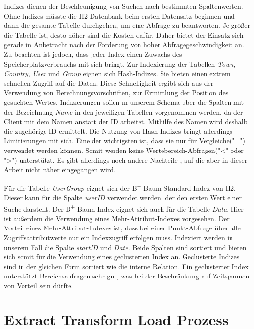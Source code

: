Indizes dienen der Beschleunigung von Suchen nach bestimmten Spaltenwerten. Ohne Indizes müsste die H2-Datenbank beim ersten Datensatz beginnen und dann die gesamte Tabelle durchgehen, um eine Abfrage zu beantworten. Je größer die Tabelle ist, desto höher sind die Kosten dafür. Daher bietet der Einsatz sich gerade in Anbetracht nach der Forderung von hoher Abfragegeschwindigkeit an. Zu beachten ist jedoch, dass jeder Index einen Zuwachs des Speicherplatzverbrauchs mit sich bringt. Zur Indexierung der Tabellen \textit{Town}, \textit{Country}, \textit{User} und \textit{Group} eignen sich Hash-Indizes. Sie bieten einen extrem schnellen Zugriff auf die Daten. Diese Schnelligkeit ergibt sich aus der Verwendung von Berechnungsvorschriften, zur Ermittlung der Position des gesuchten Wertes. Indizierungen sollen in unserem Schema über die Spalten mit der Bezeichnung \textit{Name} in den jeweiligen Tabellen vorgenommen werden, da der Client mit dem Namen anstatt der ID arbeitet. Mithilfe des Namen wird deshalb die zugehörige ID ermittelt. Die Nutzung von Hash-Indizes bringt allerdings Limitierungen mit sich. Eine der wichtigsten ist, dass sie nur für Vergleiche("=") verwendet werden können. Somit werden keine Wertebereich-Abfragen("<" oder ">") unterstützt. Es gibt allerdings noch andere Nachteile \cite{SWB-352401869}, auf die aber in dieser Arbeit nicht näher eingegangen wird. 

Für die Tabelle \textit{UserGroup} eignet sich der B\textsuperscript{+}-Baum Standard-Index von H2. Dieser kann für die Spalte \textit{userID} verwendet werden, der den ersten Wert einer Suche darstellt. Der B\textsuperscript{+}-Baum-Index eignet sich auch für die Tabelle \textit{Data}. Hier ist außerdem die Verwendung eines Mehr-Attribut-Indexes vorgesehen. Der Vorteil eines Mehr-Attribut-Indexes ist, dass bei einer Punkt-Abfrage über alle Zugriffsattributwerte nur ein Indexzugriff erfolgen muss. Indexiert werden in unserem Fall die Spalte \textit{startID} und \textit{Date}. Beide Spalten sind sortiert und bieten sich somit für die Verwendung eines geclusterten Index an. Geclusterte Indizes sind in der gleichen Form sortiert wie die interne Relation. Ein geclusterter Index unterstützt Bereichsanfragen sehr gut, was bei der Beschränkung auf Zeitspannen von Vorteil sein dürfte.       


\section{Extract Transform Load Prozess}

